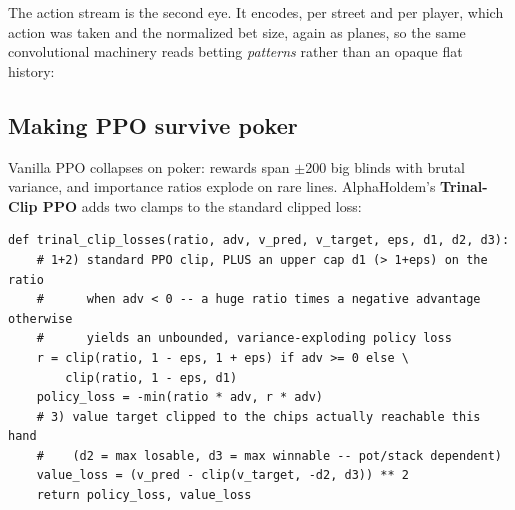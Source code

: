 \documentclass[11pt,a4paper]{article}
\begin{document}
The action stream is the second eye. It encodes, per street and per player, which
action was taken and the normalized bet size, again as planes, so the same
convolutional machinery reads betting \emph{patterns} rather than an opaque flat
history:

\begin{center}
\end{center}

\subsection{Making PPO survive poker}

Vanilla PPO collapses on poker: rewards span $\pm$200 big blinds with brutal
variance, and importance ratios explode on rare lines. AlphaHoldem's
\textbf{Trinal-Clip PPO} adds two clamps to the standard clipped loss:

\begin{lstlisting}[style=py, caption={Trinal-Clip PPO (the three clips). delta1 caps the policy ratio when the advantage is negative; delta2/delta3 cap the value target at what is physically winnable/losable in the hand.}]
def trinal_clip_losses(ratio, adv, v_pred, v_target, eps, d1, d2, d3):
    # 1+2) standard PPO clip, PLUS an upper cap d1 (> 1+eps) on the ratio
    #      when adv < 0 -- a huge ratio times a negative advantage otherwise
    #      yields an unbounded, variance-exploding policy loss
    r = clip(ratio, 1 - eps, 1 + eps) if adv >= 0 else \
        clip(ratio, 1 - eps, d1)
    policy_loss = -min(ratio * adv, r * adv)
    # 3) value target clipped to the chips actually reachable this hand
    #    (d2 = max losable, d3 = max winnable -- pot/stack dependent)
    value_loss = (v_pred - clip(v_target, -d2, d3)) ** 2
    return policy_loss, value_loss
\end{lstlisting}
\end{document}
